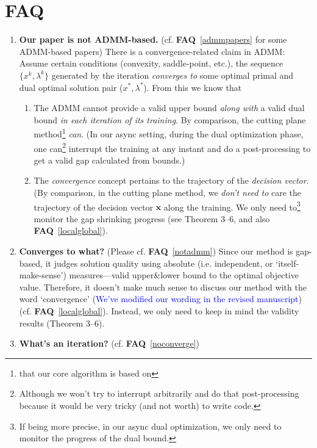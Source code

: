 \documentclass[11pt]{article}
\newcommand{\faq}[1]{\textbf{FAQ}~\ref{#1}}
\newcommand{\blue}[1]{\textcolor{blue}{#1}}
\begin{document}
\section{FAQ} \label{faqsect}
\begin{enumerate}
    \item \label{notadmm} \textbf{Our paper is not ADMM-based.} (cf. \faq{admmpapers} for some ADMM-based papers)
    There is a convergence-related claim in ADMM: Assume certain conditions (convexity, saddle-point, etc.),
    the sequence $\{x^k, \lambda^k\}$ generated by the iteration \textit{converges to} some optimal
    primal and dual optimal solution pair ($x^\ast, \lambda^\ast$).
    From this we know that \begin{enumerate}
        \item The ADMM cannot provide a valid upper bound \textit{along with} a valid dual bound \textit{in each
        iteration of its training}. By comparison, the cutting plane method\footnote{that our core algorithm is based on} \textit{can}.
        (In our async setting, during the dual optimization phase, one can\footnote{Although we won't try to interrupt arbitrarily and do that post-processing because it would be very tricky (and not worth) to write code.} interrupt the training at any instant
        and do a post-processing to get a valid gap calculated from bounds.)
        \item The \textit{convergence} concept pertains to the trajectory of the \textit{decision vector}. (By comparison,
        in the cutting plane method, we \textit{don't need to} care the trajectory of the decision vector $\mathbf{x}$ along
        the training. We only need to\footnote{If being more precise, in our async dual optimization, we only need to monitor the progress of the dual bound.} monitor the gap shrinking progress (see Theorem 3--6, and also
        \faq{localglobal}).
    \end{enumerate}
    \item \label{noconverge} \textbf{Converges to what?} (Please cf. \faq{notadmm}) Since our method is gap-based, it judges
    solution quality using absolute (i.e. independent, or `itself-make-sense') measures---valid
    upper\&lower bound to the optimal objective value.
    Therefore, it doesn't make much sense to discuss our method with the word `convergence' (\blue{We've modified our wording in the revised manuscript}) (cf. \faq{localglobal}).
    Instead, we only need to keep in mind the validity results (Theorem 3--6).
    \item \label{noiteration} \textbf{What's an iteration?} (cf. \faq{noconverge})

\end{enumerate}
\end{document}
